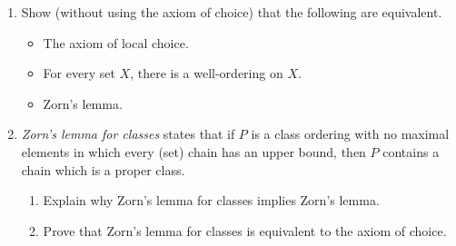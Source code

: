 \documentclass{amsart}
\theoremstyle{definition}
\begin{document}
\begin{enumerate}
  \begin{enumerate}
  \item Show (without using the axiom of choice) that the following are equivalent.
    \begin{itemize}
    \item The axiom of local choice.
    \item For every set $X$, there is a well-ordering on $X$. 
    \item Zorn's lemma.
    \end{itemize}
  \item \emph{Zorn's lemma for classes} states that if $P$ is a class ordering with no maximal elements in which every (set) chain has an upper bound, then $P$ contains a chain which is a proper class.
    \begin{enumerate}
    \item Explain why Zorn's lemma for classes implies Zorn's lemma. 
    \item Prove that Zorn's lemma for classes is equivalent to the axiom of choice.
    \end{enumerate}
  \end{enumerate}
\end{enumerate}
\end{document}
